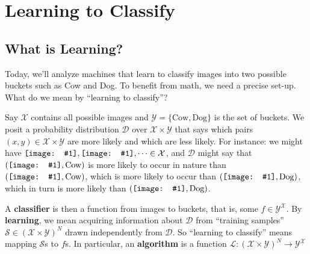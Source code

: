 \documentclass{article}
\newcommand{\Dd}{\mathcal{D}}
\newcommand{\Ll}{\mathcal{L}}
\newcommand{\Ss}{\mathcal{S}}
\newcommand{\Xx}{\mathcal{X}}
\newcommand{\Yy}{\mathcal{Y}}
\newcommand{\sdia}[1]{
\begingroup
\setbox0=\hbox{\texttt{[image: \#1]}}%
\parbox{\wd0}{\box0}\endgroup
}
\begin{document}
    \section{Learning to Classify}
        \subsection{What is Learning?}
            Today, we'll analyze machines that learn to classify images into
            two possible buckets such as Cow and Dog.
            To benefit from math, we need a precise set-up.  What do we mean
            by ``learning to classify''?

            Say $\Xx$ contains all possible images and
            $\Yy=\{\text{Cow},\text{Dog}\}$ is the set of buckets.  We posit a
            probability distribution $\Dd$ over $\Xx \times \Yy$ that says
            which pairs $(x,y)\in \Xx\times \Yy$ are more likely and which are
            less likely.  For instance: we might have $\sdia{cow-a},
            \sdia{cow-d},\cdots \in \Xx$, and $\Dd$ might say that
            $(\sdia{cow-a}, \text{Cow})$ is more likely to occur in nature than 
            $(\sdia{cow-d}, \text{Cow})$, which is more likely to occur than
            $(\sdia{cow-d}, \text{Dog})$, which in turn is more likely than
            $(\sdia{cow-a}, \text{Dog})$.

            A \textbf{classifier} is then a function from images to
            buckets, that is, some $f\in \Yy^{\Xx}$.  By \textbf{learning}, we
            mean acquiring information about $\Dd$ from ``training samples''
            $\Ss \in (\Xx\times\Yy)^N$ drawn independently from $\Dd$.  So
            ``learning to classify'' means mapping $\Ss$s to $f$s.  In
            particular, an \textbf{algorithm} is a function
            $\Ll:(\Xx\times\Yy)^N\to \Yy^{\Xx}$  

\end{document}
